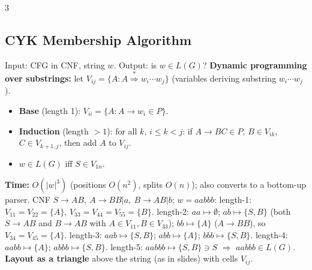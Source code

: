 \documentclass[9pt,a4paper,landscape]{extarticle}
\newcommand{\ex}[1]{\frm[FireBrick]{\textbf{Ex.\ #1}}}
\begin{document}
\begin{multicols*}{3}
\subsection{CYK Membership Algorithm}
Input: CFG in CNF, string $w$. Output: is $w\in L(G)$?
\textbf{Dynamic programming over substrings:} let $V_{ij}=\{A: A\overset{*}{\Rightarrow}w_i\cdots w_j\}$ (variables deriving substring $w_i\cdots w_j$).
\begin{itemize}
\item \textbf{Base} (length 1): $V_{ii}=\{A: A\to w_i\in P\}$.
\item \textbf{Induction} (length $>1$): for all $k$, $i\le k<j$: if $A\to BC\in P$, $B\in V_{ik}$, $C\in V_{k+1,j}$, then add $A$ to $V_{ij}$.
\item $w\in L(G)$ iff $S\in V_{1n}$.
\end{itemize}
\textbf{Time:} $O(|w|^3)$ (positions $O(n^2)$, splits $O(n)$); also converts to a bottom-up parser.
\ex{} CNF $S\to AB,\ A\to BB|a,\ B\to AB|b$; $w=aabbb$:
length-1: $V_{11}=V_{22}=\{A\}$, $V_{33}=V_{44}=V_{55}=\{B\}$.
length-2: $aa\mapsto\emptyset$; $ab\mapsto\{S,B\}$ (both $S\to AB$ and $B\to AB$ with $A\in V_{11},B\in V_{33}$); $bb\mapsto\{A\}$ ($A\to BB$), so $V_{34}=V_{45}=\{A\}$.
length-3: $aab\mapsto\{S,B\}$; $abb\mapsto\{A\}$; $bbb\mapsto\{S,B\}$.
length-4: $aabb\mapsto\{A\}$; $abbb\mapsto\{S,B\}$.
length-5: $aabbb\mapsto\{S,B\}\ni S$ $\Rightarrow$ $aabbb\in L(G)$.
\textbf{Layout as a triangle} above the string (as in slides) with cells $V_{ij}$.


\end{multicols*}
\end{document}
